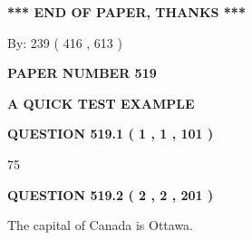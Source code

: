 \documentclass[12pt]{article}
\begin{document}
 
 
 
   
   
 \vspace{0.2in}
 
   
   
   
   
\vspace{1.0in} 
{\textbf{\large{ *** END OF PAPER, THANKS *** }}} 
   
   
\hspace{1.0in} By: 
 239 ( 416 ,  613 )
   
   
   
   
\newpage 
\setcounter{page}{ 
   519001 } 
   
   
   
   
 {\textbf{ \Large{ PAPER NUMBER  519  }}}
   
   
\vspace{0.2in}
   
   
   
   
   
   
 \vspace{0.2in}
{\LARGE {\textbf{ A QUICK TEST EXAMPLE}}}
   
   
  
\vspace{0.2in}
  
{\textbf{\Large{QUESTION
519.1 
 ( 1 , 1 , 101 )
}}}
  
  
 
 
\noindent{}

75
 
 
  
\vspace{0.2in}
  
{\textbf{\Large{QUESTION
519.2 
 ( 2 , 2 , 201 )
}}}
  
  
 
 
\noindent{}
 
 
The capital of Canada is Ottawa.
 
 
 
 
   
   
 \vspace{0.2in}
 
   
   
   
   
\end{document}
